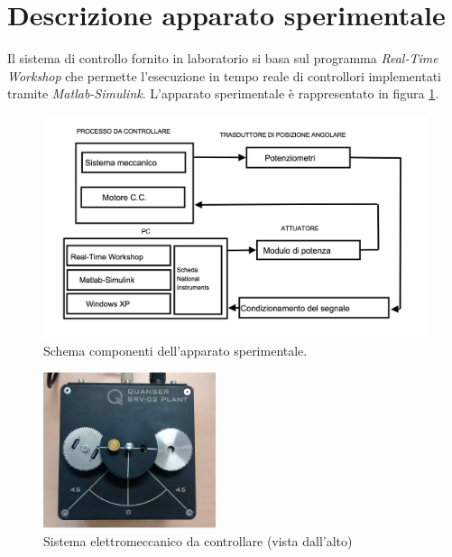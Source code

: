 \section{Descrizione apparato sperimentale}	
\label{sec:DEscrizioneApparatoSperimentale}

	Il sistema di controllo fornito in laboratorio si basa sul programma \textit{Real-Time Workshop} che permette l'esecuzione in tempo reale di controllori implementati tramite \textit{Matlab-Simulink}. L'apparato sperimentale è rappresentato in figura \ref{fig:apparatoSperimentale}.
	
	\begin{figure}[H]
		\centering
		\includegraphics[width=1\textwidth]{./figure/apparato_sperimentale}
		\caption{Schema componenti dell'apparato sperimentale.}
		\label{fig:apparatoSperimentale}
	\end{figure}
	
	\begin{figure}[H]
		\centering
		\includegraphics[width=0.45\textwidth]{./figure/motore}
		\caption{Sistema elettromeccanico da controllare (vista dall'alto)}
		\label{fig:fotoMotore}
	\end{figure}
	
